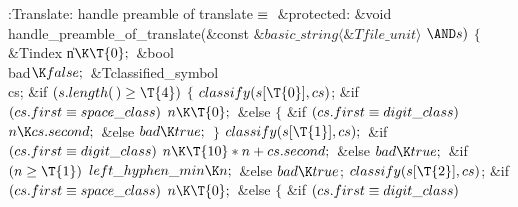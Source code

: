 \Y\B\4:Translate: handle preamble of translate\X${}\equiv{}$\6
\4\&{protected}:\6
\&{void} \\{handle\_preamble\_of\_translate}(\&{const} ${}\&{basic\_string}%
\langle\&{Tfile\_unit}\rangle{}$ ${}{\AND}\|s){}$\1\1\2\2\6
${}\{{}$\1\6
\&{Tindex} \|n${}\K\T{0};{}$\6
\&{bool} \\{bad}${}\K\\{false};{}$\6
\&{Tclassified\_symbol} \\{cs};\7
\&{if} ${}(\|s.\\{length}(\,)\G\T{4}){}$\5
${}\{{}$\1\6
${}\\{classify}(\|s[\T{0}],\39\\{cs}){}$;\6
\&{if} ${}(\\{cs}.\\{first}\equiv\\{space\_class}){}$\1\5
${}\|n\K\T{0};{}$\2\6
\&{else}\5
${}\{{}$\1\6
\&{if} ${}(\\{cs}.\\{first}\equiv\\{digit\_class}){}$\1\5
${}\|n\K\\{cs}.\\{second};{}$\2\6
\&{else}\1\5
${}\\{bad}\K\\{true};{}$\2\6
\4${}\}{}$\2\6
${}\\{classify}(\|s[\T{1}],\39\\{cs});{}$\6
\&{if} ${}(\\{cs}.\\{first}\equiv\\{digit\_class}){}$\1\5
${}\|n\K\T{10}*\|n+\\{cs}.\\{second};{}$\2\6
\&{else}\1\5
${}\\{bad}\K\\{true};{}$\2\6
\&{if} ${}(\|n\G\T{1}){}$\1\5
${}\\{left\_hyphen\_min}\K\|n;{}$\2\6
\&{else}\1\5
${}\\{bad}\K\\{true}{}$;\2\7
${}\\{classify}(\|s[\T{2}],\39\\{cs}){}$;\6
\&{if} ${}(\\{cs}.\\{first}\equiv\\{space\_class}){}$\1\5
${}\|n\K\T{0};{}$\2\6
\&{else}\5
${}\{{}$\1\6
\&{if} ${}(\\{cs}.\\{first}\equiv\\{digit\_class}){}$\1\5
